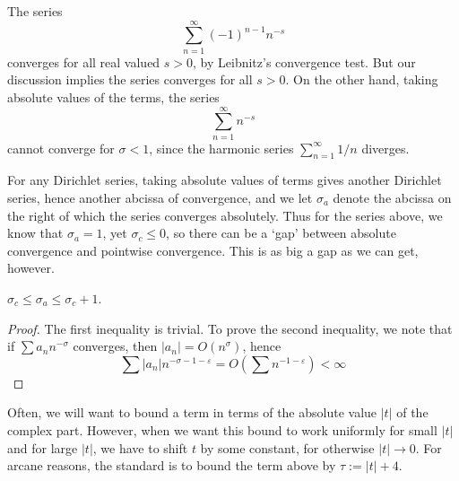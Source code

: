 \begin{example}
The series
%
\[ \sum_{n = 1}^\infty (-1)^{n-1} n^{-s} \]
%
converges for all real valued $s > 0$, by Leibnitz's convergence test. But our discussion implies the series converges for all $s > 0$. On the other hand, taking absolute values of the terms, the series
%
\[ \sum_{n = 1}^\infty n^{-s} \]
%
cannot converge for $\sigma < 1$, since the harmonic series $\sum_{n = 1}^\infty 1/n$ diverges.
\end{example}

For any Dirichlet series, taking absolute values of terms gives another Dirichlet series, hence another abcissa of convergence, and we let $\sigma_a$ denote the abcissa on the right of which the series converges absolutely. Thus for the series above, we know that $\sigma_a = 1$, yet $\sigma_c \leq 0$, so there can be a `gap' between absolute convergence and pointwise convergence. This is as big a gap as we can get, however.

\begin{theorem}
    $\sigma_c \leq \sigma_a \leq \sigma_c + 1$.
\end{theorem}
\begin{proof}
    The first inequality is trivial. To prove the second inequality, we note that if $\sum a_n n^{-\sigma}$ converges, then $|a_n| = O(n^\sigma)$, hence
    \[ \sum |a_n| n^{-\sigma-1-\varepsilon} = O \left(\sum n^{-1-\varepsilon} \right) < \infty \]
\end{proof}

Often, we will want to bound a term in terms of the absolute value $|t|$ of the complex part. However, when we want this bound to work uniformly for small $|t|$ and for large $|t|$, we have to shift $t$ by some constant, for otherwise $|t| \to 0$. For arcane reasons, the standard is to bound the term above by $\tau := |t| + 4$.

